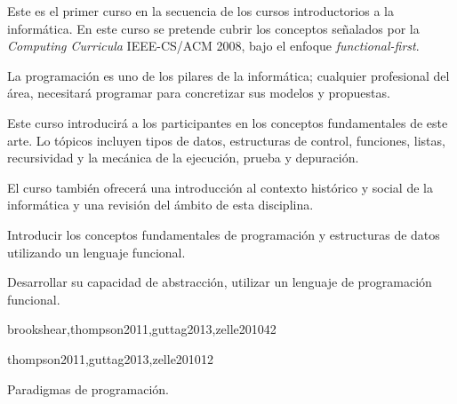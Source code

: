 \begin{syllabus}


\begin{justification}
Este es el primer curso en la secuencia de los cursos introductorios a la informática. En este curso se pretende cubrir los conceptos señalados por la \textit{Computing Curricula} IEEE-CS/ACM 2008, bajo el enfoque \textit{functional-first}.

La programación es uno de los pilares de la informática; cualquier profesional del área, necesitará programar para concretizar sus modelos y propuestas.

Este curso introducirá a los participantes en los conceptos fundamentales de este arte. Lo tópicos incluyen tipos de datos, estructuras de control, funciones, listas, recursividad y la mecánica de la ejecución, prueba y depuración.

El curso también ofrecerá una introducción al contexto histórico y social de la informática y una revisión del ámbito de esta disciplina.
\end{justification}

\begin{goals}
\item Introducir los conceptos fundamentales de programación y estructuras de datos utilizando un lenguaje funcional.
\item Desarrollar su capacidad de abstracción, utilizar un lenguaje de programación funcional.
\end{goals}

\begin{outcomes}
\end{outcomes}

\begin{unit}{\SPHistoryOfComputingDef}{brookshear,thompson2011,guttag2013,zelle2010}{4}{2}
    \SPHistoryOfComputingAllTopics
    \SPHistoryOfComputingAllObjectives
\end{unit}

\begin{unit}{\PLOverviewDef}{thompson2011,guttag2013,zelle2010}{1}{2}
   \begin{topics}
      \item \PLOverviewTopicHistory
      \item Paradigmas de programación.
   \end{topics}


\end{unit}
\end{syllabus}
